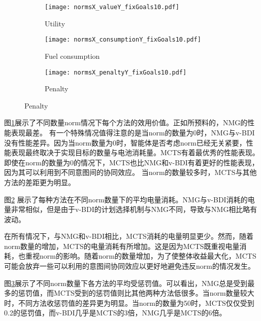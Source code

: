 \begin{figure}
\centering
\begin{subfigure}{.47\textwidth}
\centering
\texttt{[image: normsX\_valueY\_fixGoals10.pdf]}
\captionsetup{justification=centering}
\caption{Utility}
\label{fig:normsX_valueY_fixGoals10}
\end{subfigure}

\begin{subfigure}{.47\textwidth}
  \centering
  \texttt{[image: normsX\_consumptionY\_fixGoals10.pdf]}
  \captionsetup{justification=centering}
  \caption{Fuel consumption}
  \label{fig:normsX_consumptionY_fixGoals10}
\end{subfigure}
\begin{subfigure}{.47\textwidth}
  \centering
  \texttt{[image: normsX\_penaltyY\_fixGoals10.pdf]}
  \captionsetup{justification=centering}
  \caption{Penalty}
  \label{fig:normsX_penaltyY_fixGoals10}
\end{subfigure}
\captionsetup{justification=centering}
\label{fig:all_fixGoals10}
\end{figure}
图\ref{fig:normsX_valueY_fixGoals10}展示了不同数量norm情况下每个方法的效用价值。正如所预料的，NMG的性能表现最差。
有一个特殊情况值得注意的是当norm的数量为0时，NMG与v-BDI没有性能差异。因为当norm数量为0时，智能体是否考虑norm已经无关紧要，性能表现最终取决于实现目标的数量与电池消耗量。MCTS有着最优秀的性能表现。即使在norm的数量为0的情况下，MCTS也比NMG和v-BDI有着更好的性能表现，因为其可以利用到不同意图间的协同效应。
当norm的数量较多时，MCTS与其他方法的差距更为明显。

图\ref{fig:normsX_consumptionY_fixGoals10} 展示了每种方法在不同norm数量下的平均电量消耗。NMG与v-BDI消耗的电量非常相似，但是由于v-BDI的计划选择机制与NMG不同，导致与NMG相比略有波动。

在所有情况下，与NMG和v-BDI相比，MCTS消耗的电量明显更少。然而，随着norm数量的增加，MCTS的电量消耗有所增加。这是因为MCTS既重视电量消耗，也重视norm的影响。随着norm的数量增加，为了使整体收益最大化，MCTS可能会放弃一些可以利用的意图间协同效应以更好地避免违反norm的情况发生。

图\ref{fig:normsX_penaltyY_fixGoals10}展示了不同norm数量下各方法的平均受惩罚值。可以看出，NMG总是受到最多的惩罚值，而MCTS受到的惩罚值则比其他两种方法低很多。当norm数量较大时，不同方法收惩罚值的差异更为明显。当norm的数量为50时，MCTS仅仅受到0.2的惩罚值，而v-BDI几乎是MCTS的3倍，NMG几乎是MCTS的6倍。

